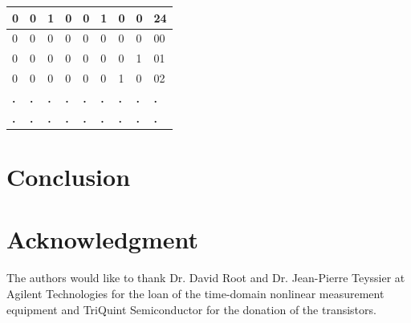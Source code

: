 \begin{table}[]
\begin{tabular}{|l|l|l|l|l|l|l|l|l|}
    \rowcolor[HTML]{F8FF00} 
    0 & 0 & 1 & 0 & 0 & 1 & 0 & 0 & 24 \\ \hline
    0 & 0 & 0 & 0 & 0 & 0 & 0 & 0 & 00 \\ \hline
    0 & 0 & 0 & 0 & 0 & 0 & 0 & 1 & 01 \\ \hline
    0 & 0 & 0 & 0 & 0 & 0 & 1 & 0 & 02 \\ \hline
    \textbf{.} & \textbf{.} & \textbf{.} & \textbf{.} & \textbf{.} & \textbf{.} & \textbf{.} & \textbf{.} & \textbf{.} \\ \hline
    \textbf{.} & \textbf{.} & \textbf{.} & \textbf{.} & \textbf{.} & \textbf{.} & \textbf{.} & \textbf{.} & \textbf{.} \\ \hline
    \end{tabular}
    \end{table}

\section{Conclusion}


\section*{Acknowledgment}


The authors would like to thank Dr. David Root and Dr. Jean-Pierre Teyssier at Agilent Technologies for the loan of the time-domain nonlinear measurement equipment and TriQuint Semiconductor for the donation of the transistors. 




%

